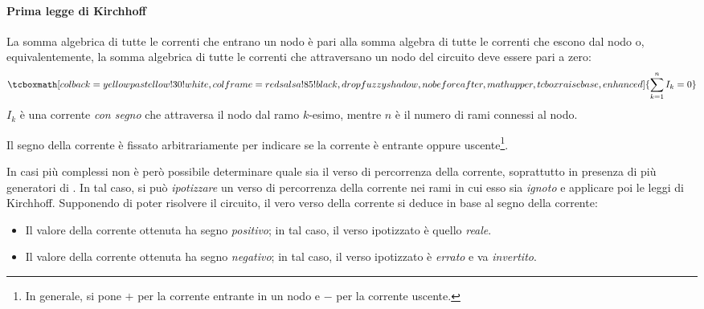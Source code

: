 \paragraph{Prima legge di Kirchhoff}
\begin{theoremaqed}
	La somma algebrica di tutte le correnti che entrano un nodo è pari alla somma algebra di tutte le correnti che escono dal nodo o, equivalentemente, la somma algebrica di tutte le correnti che attraversano un nodo del circuito deve essere pari a zero:
	\begin{equation}
		\tcboxmath[colback=yellowpastellow!30!white,colframe=redsalsa!85!black,drop fuzzy shadow, nobeforeafter, math upper, tcbox raise base, enhanced]{\sum_{k=1}^nI_k=0}
	\end{equation}
	$I_k$ è una corrente \textit{con segno} che attraversa il nodo dal ramo $k$-esimo, mentre $n$ è il numero di rami connessi al nodo.
\end{theoremaqed}
Il segno della corrente è fissato arbitrariamente per indicare se la corrente è entrante oppure uscente\footnote{In generale, si pone $+$ per la corrente entrante in un nodo e $-$ per la corrente uscente.}.

In casi più complessi non è però possibile determinare quale sia il verso di percorrenza della corrente, soprattutto in presenza di più generatori di \fem. In tal caso, si può \textit{ipotizzare} un verso di percorrenza della corrente nei rami in cui esso sia \textit{ignoto} e applicare poi le leggi di Kirchhoff. Supponendo di poter risolvere il circuito, il vero verso della corrente si deduce in base al segno della corrente:
\begin{itemize}
	\item Il valore della corrente ottenuta ha segno \textit{positivo}; in tal caso, il verso ipotizzato è quello \textit{reale}.
	\item Il valore della corrente ottenuta ha segno \textit{negativo}; in tal caso, il verso ipotizzato è \textit{errato} e va \textit{invertito}.
\end{itemize}
